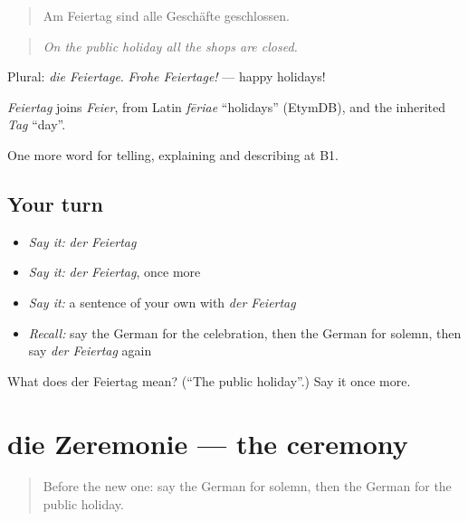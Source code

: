 \begin{quote}
Am Feiertag sind alle Geschäfte geschlossen.
\end{quote}

\begin{quote}
\emph{On the public holiday all the shops are closed.}
\end{quote}

Plural: \emph{die Feiertage}. \emph{Frohe Feiertage!} — happy holidays!

\begin{cousinweb}
\emph{Feiertag} joins \emph{Feier}, from Latin \emph{fēriae} \textquotedblleft{}holidays\textquotedblright{} (EtymDB), and the inherited \emph{Tag} \textquotedblleft{}day\textquotedblright{}.
\end{cousinweb}

\begin{grammarlens}[title={What you've built}]
One more word for telling, explaining and describing at B1.
\end{grammarlens}

\subsection*{Your turn}
\begin{itemize}
\raggedright
  \item \emph{Say it:} \emph{der Feiertag}
  \item \emph{Say it:} \emph{der Feiertag}, once more
  \item \emph{Say it:} a sentence of your own with \emph{der Feiertag}
  \item \emph{Recall:} say the German for the celebration, then the German for solemn, then say \emph{der Feiertag} again
\end{itemize}

\begin{tcolorbox}[breakable,colback=teal!4,colframe=teal!35!black,title={Before you move on}]
What does der Feiertag mean? (\textquotedblleft{}The public holiday\textquotedblright{}.) Say it once more.
\end{tcolorbox}
\section[die Zeremonie]{die Zeremonie — the ceremony}

\label{lesson:GE-C305-zeremonie}



\begin{quote}
Before the new one: say the German for solemn, then the German for the public holiday.
\end{quote}

